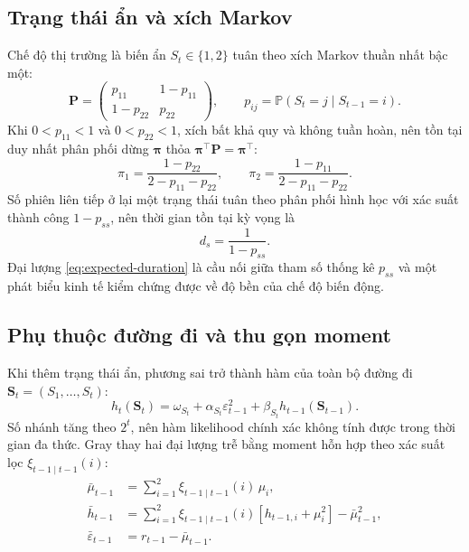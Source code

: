 \documentclass[12pt,a4paper]{article}
\numberwithin{equation}{section}
\theoremstyle{definition}
\newcommand{\Prob}{\mathbb{P}}
\newcommand{\Pmat}{\symbf{P}}
\begin{document}
\subsection{Trạng thái ẩn và xích Markov}\label{subsec:markov}
Chế độ thị trường là biến ẩn $S_t\in\{1,2\}$ tuân theo xích Markov thuần nhất bậc một:
\begin{equation}
  \Pmat=\begin{pmatrix} p_{11} & 1-p_{11}\\ 1-p_{22} & p_{22}\end{pmatrix},
  \qquad p_{ij}=\Prob\!\left(S_t=j\mid S_{t-1}=i\right).
  \label{eq:trans-mat}
\end{equation}
Khi $0<p_{11}<1$ và $0<p_{22}<1$, xích bất khả quy và không tuần hoàn, nên tồn tại duy
nhất phân phối dừng $\symbf\pi$ thỏa $\symbf\pi^{\top}\Pmat=\symbf\pi^{\top}$:
\begin{equation}
  \pi_1=\frac{1-p_{22}}{2-p_{11}-p_{22}},\qquad
  \pi_2=\frac{1-p_{11}}{2-p_{11}-p_{22}}.
  \label{eq:stationary-markov}
\end{equation}
Số phiên liên tiếp ở lại một trạng thái tuân theo phân phối hình học với xác suất thành
công $1-p_{ss}$, nên thời gian tồn tại kỳ vọng là
\begin{equation}
  d_s=\frac{1}{1-p_{ss}}.
  \label{eq:expected-duration}
\end{equation}
Đại lượng \eqref{eq:expected-duration} là cầu nối giữa tham số thống kê $p_{ss}$ và một
phát biểu kinh tế kiểm chứng được về độ bền của chế độ biến động.

\subsection{Phụ thuộc đường đi và thu gọn moment}\label{subsec:collapsing}
Khi thêm trạng thái ẩn, phương sai trở thành hàm của toàn bộ đường đi
$\symbf S_t=(S_1,\dots,S_t)$:
\begin{equation}
  h_t(\symbf S_t)=\omega_{S_t}+\alpha_{S_t}\varepsilon_{t-1}^{2}
  +\beta_{S_t}h_{t-1}(\symbf S_{t-1}).
  \label{eq:path-dependent-msgarch}
\end{equation}
Số nhánh tăng theo $2^{t}$, nên hàm likelihood chính xác không tính được trong thời gian
đa thức. Gray \cite{gray1996} thay hai đại lượng trễ bằng moment hỗn hợp theo xác suất
lọc $\xi_{t-1\mid t-1}(i)$:
\begin{align}
  \bar\mu_{t-1} &= \sum_{i=1}^{2}\xi_{t-1\mid t-1}(i)\,\mu_i,
  \label{eq:collapsed-mean}\\
  \bar h_{t-1} &= \sum_{i=1}^{2}\xi_{t-1\mid t-1}(i)
  \left[h_{t-1,i}+\mu_i^{2}\right]-\bar\mu_{t-1}^{2},
  \label{eq:collapsed-variance}\\
  \bar\varepsilon_{t-1} &= r_{t-1}-\bar\mu_{t-1}.
  \label{eq:collapsed-residual}
\end{align}
\end{document}
